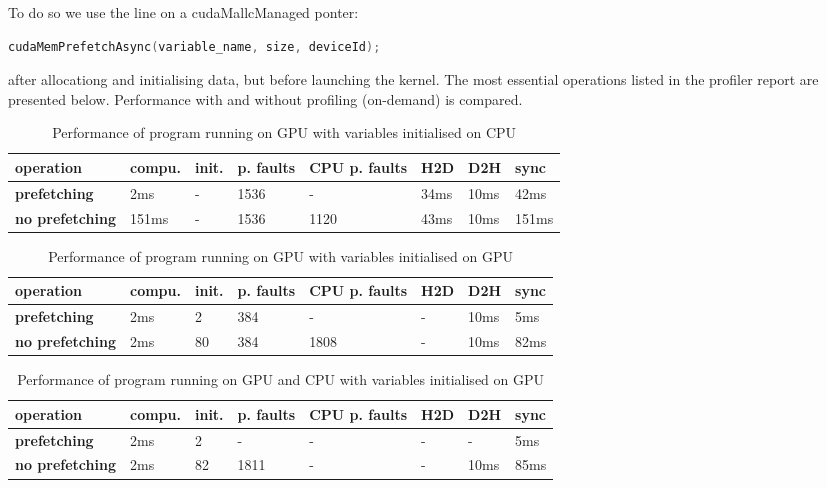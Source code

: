 \documentclass[12pt]{article}
\begin{document}
To do so we use the line on a cudaMallcManaged ponter:
\begin{lstlisting}[language=C]
	cudaMemPrefetchAsync(variable_name, size, deviceId);
\end{lstlisting}
after allocationg and initialising data, but before launching the kernel.
The most essential operations listed in the profiler report are presented below. Performance with and without profiling (on-demand) is compared. 

\begin{table}[H]
\caption{Performance of program running on GPU with variables initialised on CPU}
\begin{tabular}{|l|l|l|l|l|l|l|l|}
\hline
\textbf{operation} & \textbf{compu.} & \textbf{init.} & \textbf{p. faults} & \textbf{CPU p. faults} & \textbf{H2D} & \textbf{D2H}  & \textbf{sync}\\ \hline
\textbf{prefetching} & 2ms & - & 1536 & - & 34ms                 & 10ms & 42ms\\ \hline
\textbf{no prefetching} & 151ms & - & 1536 & 1120 & 43ms & 10ms & 151ms\\ \hline
\end{tabular}
\end{table}

\begin{table}[H]
\caption{Performance of program running on GPU with variables initialised on GPU}
\begin{tabular}{|l|l|l|l|l|l|l|l|}
\hline
\textbf{operation} & \textbf{compu.} & \textbf{init.} & \textbf{p. faults} & \textbf{CPU p. faults} & \textbf{H2D} & \textbf{D2H}  & \textbf{sync}\\ \hline
\textbf{prefetching} & 2ms & 2 & 384 & - & -                 & 10ms & 5ms\\ \hline
\textbf{no prefetching} & 2ms & 80 & 384 & 1808 & - & 10ms & 82ms\\ \hline
\end{tabular}
\end{table}

\begin{table}[H]
\caption{Performance of program running on GPU and CPU with variables initialised on GPU}
\begin{tabular}{|l|l|l|l|l|l|l|l|}
\hline
\textbf{operation} & \textbf{compu.} & \textbf{init.} & \textbf{p. faults} & \textbf{CPU p. faults} & \textbf{H2D} & \textbf{D2H}  & \textbf{sync}\\ \hline
\textbf{prefetching} & 2ms & 2 & - & - & -                 & - & 5ms\\ \hline
\textbf{no prefetching} & 2ms & 82 & 1811 & - & - & 10ms & 85ms\\ \hline
\end{tabular}
\end{table}
%     
\end{document}
